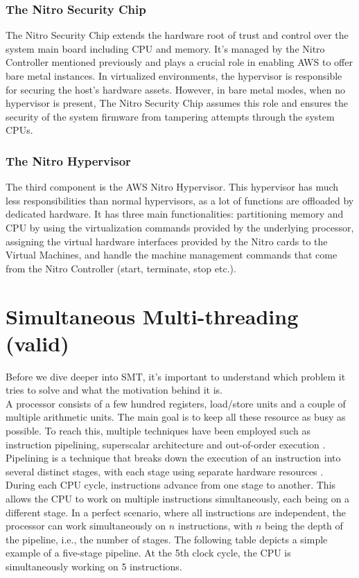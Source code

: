 \subsubsection{The Nitro Security Chip}
The Nitro Security Chip extends the hardware root of trust and control over the system main board including 
CPU and memory. It's managed by the Nitro Controller mentioned previously and plays a crucial role in enabling 
AWS to offer bare metal instances. In virtualized environments, the hypervisor is responsible for securing the 
host's hardware assets. However, in bare metal modes, when no hypervisor is present, The Nitro Security Chip 
assumes this role and ensures the security of the system firmware from tampering attempts through the system 
CPUs.  
\subsubsection{The Nitro Hypervisor}
The third component is the AWS Nitro Hypervisor. This hypervisor has much less responsibilities than normal 
hypervisors, as a lot of functions are offloaded by dedicated hardware. It has three main functionalities: 
partitioning memory and CPU by using the virtualization commands provided by the underlying processor, 
assigning the virtual hardware interfaces provided by the Nitro cards to the Virtual Machines, and handle 
the machine management commands that come from the Nitro Controller (start, terminate, stop etc.). 

\section{Simultaneous Multi-threading (valid)}
Before we dive deeper into \ac{SMT}, it's important to understand which problem it  
tries to solve and what the motivation behind it is. \\
A processor consists of a few hundred registers, load/store units and a couple of multiple arithmetic units. 
The main goal is to keep all these resource as busy as possible. To reach this, multiple techniques have been 
employed such as instruction pipelining, superscalar architecture and out-of-order execution 
\cite{SMT_Maximizing_on_chip_parallelism}.
Pipelining is a technique that breaks down the execution of an instruction into several distinct 
stages, with each stage using separate hardware resources \cite{SMT_under_the_hood}. During each CPU cycle, 
instructions advance from one stage to another. This allows the CPU to work on multiple instructions 
simultaneously, each being on a different stage. In a perfect scenario, where all instructions are 
independent, the processor can work simultaneously on \begin{math}n\end{math} instructions, 
with \begin{math}n\end{math} being the depth of the pipeline, i.e., the number of stages. 
The following table depicts a simple example of a five-stage pipeline. At the 5th clock cycle, 
the CPU is simultaneously working on 5 instructions.  

